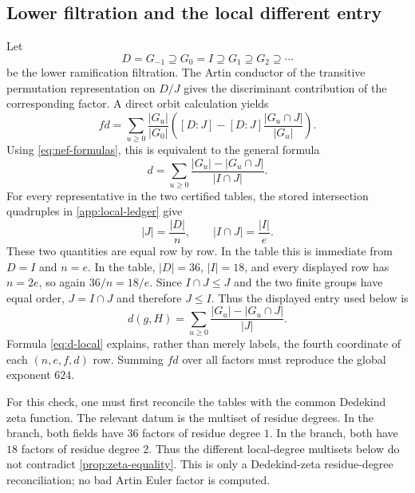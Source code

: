 \subsection{Lower filtration and the local different entry}

Let
\[
 D=G_{-1}\supseteq G_0=I\supseteq G_1\supseteq G_2\supseteq\cdots
\]
be the lower ramification filtration.  The Artin conductor of the transitive
permutation representation on $D/J$ gives the discriminant contribution of
the corresponding factor.  A direct orbit calculation yields
\begin{equation}
 f d
 =\sum_{u\geq0}\frac{|G_u|}{|G_0|}
 \left([D:J]-[D:J]\frac{|G_u\cap J|}{|G_u|}\right).
 \label{eq:fd-artin}
\end{equation}
Using \eqref{eq:nef-formulas}, this is equivalent to the general formula
\begin{equation}
 d=\sum_{u\geq0}
 \frac{|G_u|-|G_u\cap J|}{|I\cap J|}.
 \label{eq:d-general}
\end{equation}
For every representative in the two certified tables, the stored
intersection quadruples in \cref{app:local-ledger} give
\begin{equation}
 |J|=\frac{|D|}{n},
 \qquad
 |I\cap J|=\frac{|I|}{e}.
 \label{eq:J-intersection-orders}
\end{equation}
These two quantities are equal row by row.  In the  table this is
immediate from $D=I$ and $n=e$.  In the  table, $|D|=36$,
$|I|=18$, and every displayed row has $n=2e$, so again
$36/n=18/e$.  Since $I\cap J\leq J$ and the two finite groups have equal
order, $J=I\cap J$ and therefore $J\leq I$.  Thus the displayed entry used
below is
\begin{equation}
 d(g,H)=\sum_{u\geq0}
 \frac{|G_u|-|G_u\cap J|}{|J|}.
 \label{eq:d-local}
\end{equation}
Formula \eqref{eq:d-local} explains, rather than merely labels, the fourth
coordinate of each $(n,e,f,d)$ row.  Summing $fd$ over all factors must
reproduce the global exponent $624$.

For this check, one must first reconcile the tables with the common Dedekind
zeta function.  The relevant datum is the multiset of residue degrees.  In
the  branch, both fields have
$36$ factors of residue degree $1$.  In the  branch, both have
$18$ factors of residue degree $2$.  Thus the different local-degree
multisets below do not contradict \cref{prop:zeta-equality}.  This is only a
Dedekind-zeta residue-degree reconciliation; no bad Artin Euler factor is
computed.

